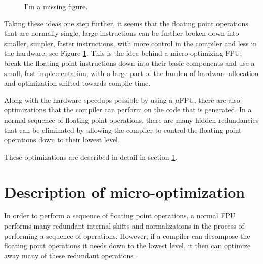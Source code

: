 \begin{figure}[!ht]
	\centering
	\caption{I'm a missing figure.}
	\label{ch1:figure1}
\end{figure}

Taking these ideas one step further, it seems that the floating point
operations that are normally single, large instructions can be further broken
down into smaller, simpler, faster instructions, with more control in the
compiler and less in the hardware, see Figure \ref{ch1:figure1}.  This is the idea behind a
micro-optimizing FPU; break the floating point instructions down into their
basic components and use a small, fast implementation, with a large part of
the burden of hardware allocation and optimization shifted towards
compile-time.

% 
% 

Along with the hardware speedups possible by using a $\mu$FPU, there are
also optimizations that the compiler can perform on the code that is
generated.  In a normal sequence of floating point operations, there are
many hidden redundancies that can be eliminated by allowing the compiler to
control the floating point operations down to their lowest level.

These optimizations are described in detail in section \ref{ch1:opts}.

\section{Description of micro-optimization}\label{ch1:opts}

In order to perform a sequence of floating point operations, a normal FPU
performs many redundant internal shifts and normalizations in the process of
performing a sequence of operations.  However, if a compiler can
decompose the floating point operations it needs down to the lowest level,
it then can optimize away many of these redundant operations \cite{inproceedings-full}.  

